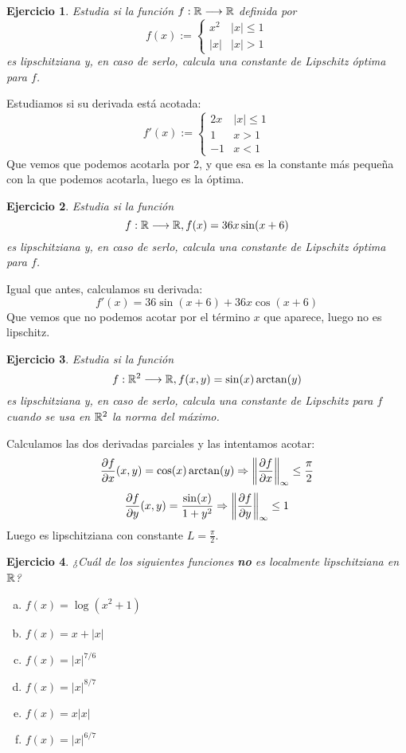 \documentclass[12pt]{report}
\newtheorem{ejercicio}{Ejercicio}
\theoremstyle{definition}
\theoremstyle{remark}
\begin{document}
\begin{ejercicio}
Estudia si la función $f : \mathbb{R} \longrightarrow \mathbb{R}$ definida por
\[
f(x):=\left\{
\begin{array}{cc}
x^2 & |x|\leq 1 \\
|x| & |x| > 1
\end{array}
\right.
\]
es lipschitziana y, en caso de serlo,  calcula una constante de Lipschitz óptima para $f$.
\end{ejercicio}

Estudiamos si su derivada está acotada:
\[
f'(x):=\left\{
\begin{array}{cc}
2x & |x|\leq 1 \\
1 & x > 1 \\
-1 & x < 1
\end{array}
\right.
\]
Que vemos que podemos acotarla por 2, y que esa es la constante más pequeña con la que podemos acotarla, luego es la óptima.

\begin{ejercicio}
Estudia si la función 
\[
f : \mathbb{R} \longrightarrow \mathbb{R}, f(x)=36x\sin(x+6)
\]
es lipschitziana y, en caso de serlo,  calcula una constante de Lipschitz óptima para $f$.
\end{ejercicio}

Igual que antes, calculamos su derivada:
\[
f'(x)=36\sin(x+6)+36x\cos(x+6)
\]
Que vemos que no podemos acotar por el término $x$ que aparece, luego no es lipschitz.

\begin{ejercicio}
Estudia si la función 
\[
f : \mathbb{R}^2 \longrightarrow \mathbb{R}, f(x,y)=\sin(x)\arctan(y)
\]
es lipschitziana y, en caso de serlo,  calcula una constante de Lipschitz para $f$ cuando se usa en $\mathbb{R}^2$ la norma del máximo.
\end{ejercicio}
Calculamos las dos derivadas parciales y las intentamos acotar:
\[
\frac{\partial f }{\partial x }(x,y)=\cos(x)\arctan(y)\Rightarrow \left\lVert\frac{\partial f }{\partial x }\right\rVert_\infty \leq \frac{\pi}{2} 
\]
\[
\frac{\partial f }{\partial y }(x,y)= \frac{\sin(x)}{1+y^2} \Rightarrow \left\lVert\frac{\partial f }{\partial y }\right\rVert_\infty \leq 1 
\]
Luego es lipschitziana con constante $L=\frac{\pi}{2}$.

\begin{ejercicio}
¿Cuál de los siguientes funciones \textbf{no} es localmente lipschitziana en $\mathbb{R}$?
\begin{enumerate}[(a)]
\item $f(x)=\log(x^2+1)$
\item $f(x)=x+|x|$
\item $f(x)=|x|^{7/6}$
\item $f(x)=|x|^{8/7}$
\item $f(x)=x|x|$
\item $f(x)=|x|^{6/7}$
\end{enumerate}
\end{ejercicio}
\end{document}
